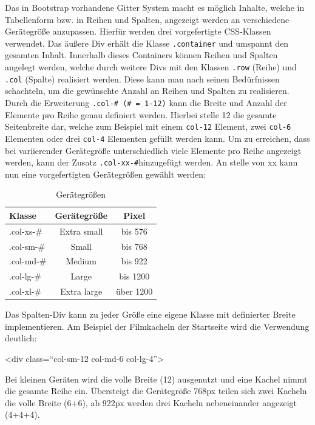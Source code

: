 	Das in Bootstrap vorhandene Gitter System macht es möglich Inhalte, welche in Tabellenform bzw. in Reihen und Spalten, angezeigt werden an verschiedene Gerätegröße anzupassen. Hierfür werden drei vorgefertigte CSS-Klassen verwendet. Das äußere Div erhält die Klasse \texttt{.container} und umspannt den gesamten Inhalt. Innerhalb dieses Containers können Reihen und Spalten angelegt werden, welche durch weitere Divs mit den Klassen \texttt{.row} (Reihe) und \texttt{.col} (Spalte) realisiert werden. Diese kann man nach seinen Bedürfnissen schachteln, um die gewünschte Anzahl an Reihen und Spalten zu realisieren. Durch die Erweiterung \texttt{.col-\# (\# = 1-12)} kann die Breite und Anzahl der Elemente pro Reihe genau definiert werden. Hierbei stelle 12 die gesamte Seitenbreite dar, welche zum Beispiel mit einem 
	\texttt{col-12}  Element, zwei \texttt{col-6} Elementen oder drei \texttt{col-4} Elementen gefüllt werden kann. Um zu erreichen, dass bei variierender Gerätegröße unterschiedlich viele Elemente pro Reihe angezeigt werden, kann der Zusatz \texttt{.col-xx-\#}hinzugefügt werden. An stelle von xx kann nun eine vorgefertigten Gerätegrößen gewählt werden:
	
	\begin{table}[H]
		\centering
		\begin{tabular}{p{} | c | c }
			\textbf{Klasse} & \textbf{Gerätegröße} & \textbf{Pixel} \\\toprule
			.col-xs-\# &  Extra small &  bis 576 \\
			.col-sm-\# &  Small &  bis 768  \\
			.col-md-\# &  Medium &  bis 922  \\
			.col-lg-\# &  Large &  bis 1200  \\
			.col-xl-\# &  Extra large &  über 1200  \\
		\end{tabular}
		\caption[Gerätegrößen]{\label{tab:gerätegrößen}Gerätegrößen }
	\end{table}
	
	Das Spalten-Div kann zu jeder Größe eine eigene Klasse mit definierter Breite implementieren. Am Beispiel der Filmkacheln der Startseite wird die Verwendung deutlich:
		\begin{center}
			<div class=“col-sm-12 col-md-6 col-lg-4”>
		\end{center}

	Bei kleinen Geräten wird die volle Breite (12) ausgenutzt und eine Kachel nimmt die gesamte Reihe ein. Übersteigt die Gerätegröße 768px teilen sich zwei Kacheln die volle Breite (6+6), ab 922px werden drei Kacheln nebeneinander angezeigt (4+4+4).
	
